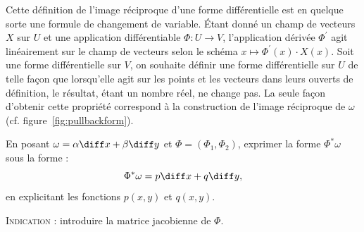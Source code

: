 Cette définition de l'image réciproque d'une forme différentielle est en quelque sorte une formule de changement de variable. Étant donné un champ de vecteurs $X$ sur $U$ et une application différentiable $\Phi\colon U \to V$, l'application dérivée $\Phi^\prime$ agit linéairement sur le champ de vecteurs selon le schéma $x \mapsto \Phi^\prime(x) \cdot X(x)$. Soit une forme différentielle sur $V$, on souhaite définir une forme différentielle sur $U$ de telle façon que lorsqu'elle agit sur les points et les vecteurs dans leurs ouverts de définition, le résultat, étant un nombre réel, ne change pas. La seule façon d'obtenir cette propriété correspond à la construction de l'image réciproque de $\omega$ (cf. figure~\ref{fig:pullbackform}).  



\begin{exercice}
En posant $\omega = \alpha \diff x + \beta \diff y$ et $\Phi=(\Phi_1,\Phi_2)$,
exprimer la forme $\Phi^\ast\omega$ sous la forme :
\[\Phi^\ast \omega = p \diff x + q \diff y,\]
en explicitant les fonctions $p(x,y)$ et $q(x,y)$. 

\textsc{Indication} : introduire la matrice jacobienne de $\Phi$. 
\end{exercice}


